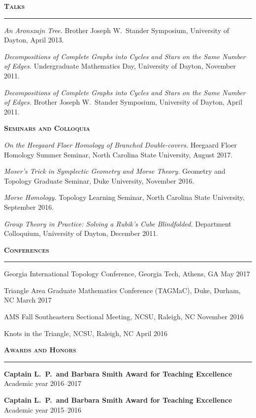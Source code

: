 \documentclass[10pt]{article}
\newcommand{\sect}[1]{
\vspace{.75em}
\textbf{\textsc{\Large #1}}

\vspace{-1.5em}
\noindent\rule{\textwidth}{.5pt}
\vspace{-1.5em}
}
\begin{document}
\sect{Talks}

\setlength{\leftskip}{1em}

\emph{An Aronszajn Tree.} Brother Joseph W.\ Stander Symposium, University of
Dayton, April 2013.

\emph{Decompositions of Complete Graphs into Cycles and Stars on the Same Number
of Edges.} Undergraduate Mathematics Day, University of Dayton, November 2011.

\emph{Decompositions of Complete Graphs into Cycles and Stars on the Same Number
of Edges.} Brother Joseph W.\ Stander Symposium, University of Dayton, April
2011.

\setlength{\leftskip}{0em}

\vspace{.5em}
\textbf{\textsc{\large Seminars and Colloquia}}
\vspace{-.25em}

\setlength{\leftskip}{1em}

\emph{On the Heegaard Floer Homology of Branched Double-covers.} Heegaard Floer
Homology Summer Seminar, North Carolina State University, August 2017.

\emph{Moser's Trick in Symplectic Geometry and Morse Theory.} Geometry and
Topology Graduate Seminar, Duke University, November 2016.

\emph{Morse Homology.} Topology Learning Seminar, North Carolina State
University, September 2016.

\emph{Group Theory in Practice: Solving a Rubik's Cube Blindfolded.} Department
Colloquium, University of Dayton, December 2011.

\setlength{\leftskip}{0em}

\sect{Conferences}

Georgia International Topology Conference, Georgia Tech, Athens, GA \hfill May
2017\setlength{\parskip}{.25em}

Triangle Area Graduate Mathematics Conference (TAGMaC), Duke, Durham, NC \hfill
March 2017

AMS Fall Southeastern Sectional Meeting, NCSU, Raleigh, NC \hfill November 2016

Knots in the Triangle, NCSU, Raleigh, NC \hfill April 2016%
\setlength{\parskip}{.75em}

\newpage
\sect{Awards and Honors}

\textbf{Captain L.\ P.\ and Barbara Smith Award for Teaching
Excellence} \hfill Academic year 2016--2017\setlength{\parskip}{.25em}

\textbf{Captain L.\ P.\ and Barbara Smith Award for Teaching
Excellence} \hfill Academic year 2015--2016
\end{document}
